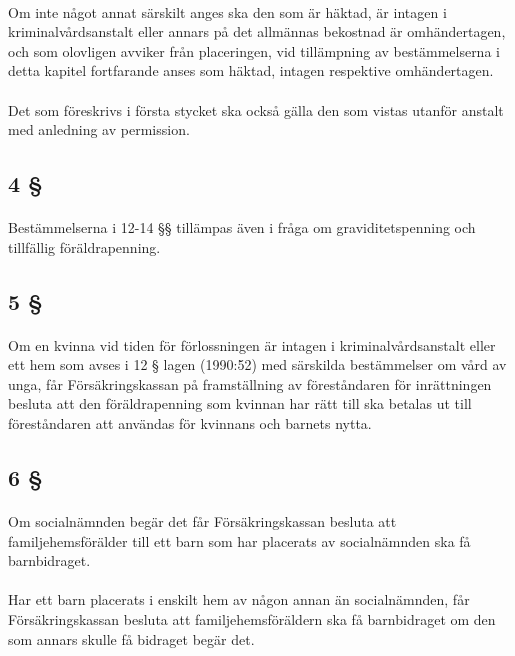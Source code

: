 \documentclass[a4paper,notitlepage,openany,10pt]{book}
\begin{document}
\paragraph*{}
Om inte något annat särskilt anges ska den som är häktad, är intagen i kriminalvårdsanstalt eller annars på det allmännas bekostnad är omhändertagen, och som olovligen avviker från placeringen, vid tillämpning av bestämmelserna i detta kapitel fortfarande anses som häktad, intagen respektive omhändertagen.
\paragraph*{}
Det som föreskrivs i första stycket ska också gälla den som vistas utanför anstalt med anledning av permission.
\subsection*{4 §}
\paragraph*{}
Bestämmelserna i 12-14 §§ tillämpas även i fråga om graviditetspenning och tillfällig föräldrapenning.
\subsection*{5 §}
\paragraph*{}
Om en kvinna vid tiden för förlossningen är intagen i kriminalvårdsanstalt eller ett hem som avses i 12 § lagen (1990:52) med särskilda bestämmelser om vård av unga, får Försäkringskassan på framställning av föreståndaren för inrättningen besluta att den föräldrapenning som kvinnan har rätt till ska betalas ut till föreståndaren att användas för kvinnans och barnets nytta.
\subsection*{6 §}
\paragraph*{}
Om socialnämnden begär det får Försäkringskassan besluta att familjehemsförälder till ett barn som har placerats av socialnämnden ska få barnbidraget.
\paragraph*{}
Har ett barn placerats i enskilt hem av någon annan än socialnämnden, får Försäkringskassan besluta att familjehemsföräldern ska få barnbidraget om den som annars skulle få bidraget begär det.
\end{document}
